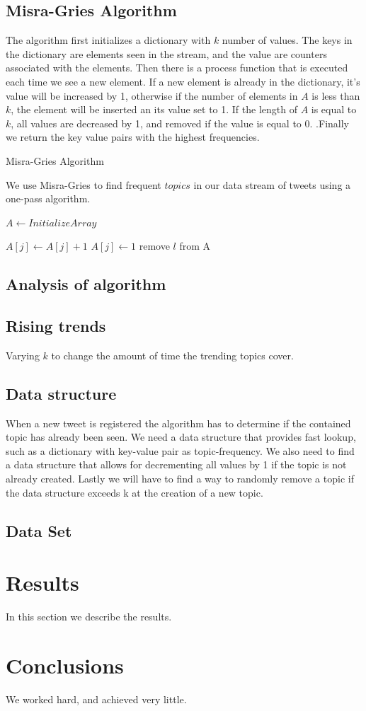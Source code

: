 \documentclass[12pt]{article}
\begin{document}
\subsection{Misra-Gries Algorithm}
The algorithm first initializes a dictionary with $k$ number of values. The keys in the dictionary are elements seen in the stream, and the value are counters associated with the elements. Then there is a process function that is executed each time we see a new element. If a new element is already in the dictionary, it's value will be increased by 1, otherwise if the number of elements in $A$ is less than $k$, the element will be inserted an its value set to 1. If the length of $A$ is equal to $k$, all values are decreased by 1, and removed if the value is equal to 0. \cite{Amit}.Finally we return the key value pairs with the highest frequencies.
\begin{algorithm}
\caption{Misra-Gries Algorithm}
We use Misra-Gries to find frequent $topics$ in our data stream of tweets using a one-pass algorithm.
\begin{algorithmic}
\State $A\gets Initialize Array$

	\State $A[j] \leftarrow A[j] + 1$
	\State $A[j] \leftarrow 1$
\Else
		 remove $l$ from A
		\EndIf
	\EndFor
\EndIf
\EndFunction
\end{algorithmic}
\end{algorithm}

\subsection{Analysis of algorithm}

\subsection{Rising trends}
Varying $k$ to change the amount of time the trending topics cover.

\subsection{Data structure}
When a new tweet is registered the algorithm has to determine if the contained topic has already been seen. We need a data structure that provides fast lookup, such as a dictionary with key-value pair as topic-frequency. We also need to find a data structure that allows for decrementing all values by 1 if the topic is not already created. Lastly we will have to find a way to randomly remove a topic if the data structure exceeds k at the creation of a new topic.

\subsection{Data Set}

\section{Results}\label{results}
In this section we describe the results.

\section{Conclusions}\label{conclusions}
We worked hard, and achieved very little.



\end{document}
